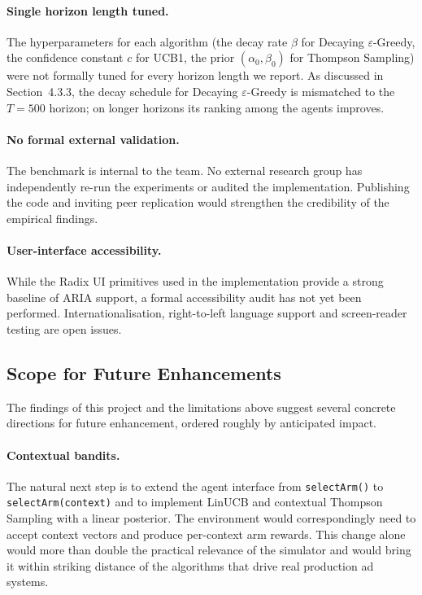 \paragraph{Single horizon length tuned.} The hyperparameters for each algorithm (the decay rate $\beta$ for Decaying $\varepsilon$-Greedy, the confidence constant $c$ for UCB1, the prior $(\alpha_0, \beta_0)$ for Thompson Sampling) were not formally tuned for every horizon length we report. As discussed in Section~4.3.3, the decay schedule for Decaying $\varepsilon$-Greedy is mismatched to the $T = 500$ horizon; on longer horizons its ranking among the agents improves.

\paragraph{No formal external validation.} The benchmark is internal to the team. No external research group has independently re-run the experiments or audited the implementation. Publishing the code and inviting peer replication would strengthen the credibility of the empirical findings.

\paragraph{User-interface accessibility.} While the Radix UI primitives used in the implementation provide a strong baseline of ARIA support, a formal accessibility audit has not yet been performed. Internationalisation, right-to-left language support and screen-reader testing are open issues.

\subsection{Scope for Future Enhancements}
The findings of this project and the limitations above suggest several concrete directions for future enhancement, ordered roughly by anticipated impact.

\paragraph{Contextual bandits.} The natural next step is to extend the agent interface from \texttt{selectArm()} to \texttt{selectArm(context)} and to implement LinUCB and contextual Thompson Sampling with a linear posterior. The environment would correspondingly need to accept context vectors and produce per-context arm rewards. This change alone would more than double the practical relevance of the simulator and would bring it within striking distance of the algorithms that drive real production ad systems.

